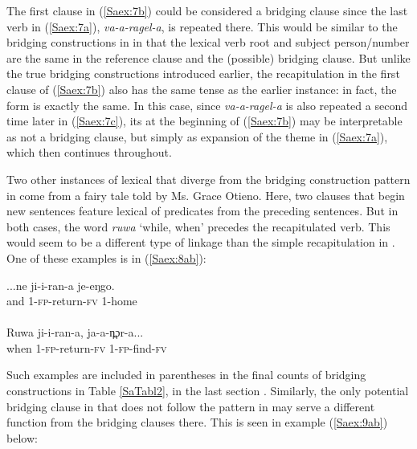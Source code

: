 \documentclass[output=paper]{LSP/langsci}
\begin{document}
The first clause in (\ref{Saex:7b}) could be considered a bridging clause since the last verb in (\ref{Saex:7a}), \textit{va-a-ragel-a}, is repeated there. This would be similar to the bridging constructions in  in that the lexical verb root and subject person\slash number are the same in the reference clause and the (possible) bridging clause. But unlike the true bridging constructions introduced earlier, the recapitulation in the first clause of (\ref{Saex:7b}) also has the same tense as the earlier instance: in fact, the form is exactly the same. In this case, since \textit{va-a-ragel-a} is also repeated a second time later in (\ref{Saex:7c}), its  at the beginning of (\ref{Saex:7b}) may be interpretable as not a bridging clause, but simply as expansion of the theme in (\ref{Saex:7a}), which then continues throughout. 

Two other instances of lexical  that diverge from the bridging construction pattern in  come from a fairy tale told by Ms. Grace Otieno. Here, two clauses that begin new  sentences feature lexical  of predicates from the preceding sentences. But in both cases, the word \textit{ruwa} `while, when' precedes the recapitulated verb. This would seem to be a different type of linkage than the simple recapitulation in . One of these examples is in (\ref{Saex:8ab}):
 
\begin{exe}
\ex \label{Saex:8ab}
\begin{xlist}
\ex \label{Saex:8a}
\gll ...ne  ji-i-ran-a  je-eŋgo. \\
and  \textsc{1}-\textsc{fp}-return-\textsc{fv}  \textsc{1}-home\\
\glt {}\\
\ex \label{Saex:8b}
\gll Ruwa  ji-i-ran-a,  ja-a-n̪ɔr-a...\\     	       
   when  \textsc{1-fp}-return-\textsc{fv}  \textsc{1-fp}-find-\textsc{fv}\\
\glt {} 
\end{xlist}
\end{exe}

Such examples are included in parentheses in the final counts of bridging constructions in Table \ref{SaTabl2}, in the last section . Similarly, the only potential bridging clause in \citet{Chesi2014} that does not follow the pattern in  may serve a different function from the bridging clauses there. This is seen in example (\ref{Saex:9ab}) below:
\end{document}
